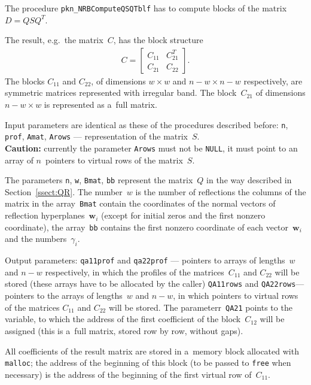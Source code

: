 The procedure \texttt{pkn\_NRBComputeQSQTblf} has to compute blocks of the matrix
$D=QSQ^T$.

The result, e.g.\ the matrix~$C$, has the block structure
\begin{align*}
  C = \left[\begin{array}{cc}
     C_{11} & C_{21}^T \\ C_{21} & C_{22}
  \end{array}\right].
\end{align*}
The blocks $C_{11}$ and $C_{22}$, of dimensions $w\times w$ and
$n-w\times n-w$ respectively, are symmetric matrices represented
with irregular band. The block~$C_{21}$ of dimensions
$n-w\times w$ is represented as a~full matrix.

Input parameters are identical as these of the procedures
described before: \texttt{n}, \texttt{prof}, \texttt{Amat},
\texttt{Arows} --- representation of the matrix~$S$. \\
\textbf{Caution:} currently the parameter \texttt{Arows} must not be
\texttt{NULL}, it must point to an array of $n$~pointers to virtual
rows of the matrix~$S$.

The parameters \texttt{n}, \texttt{w}, \texttt{Bmat}, \texttt{bb} represent
the matrix~$Q$ in the way described in Section~\ref{ssect:QR}.
The number~$w$ is the number of reflections the columns of the matrix
in the array~\texttt{Bmat} contain the coordinates of the normal vectors
of reflection hyperplanes~$\bm{w}_i$
(except for initial zeros and the first nonzero coordinate),
the array~\texttt{bb} contains the first nonzero coordinate of each
vector~$\bm{w}_i$ and the numbers~$\gamma_i$.

Output parameters: \texttt{qa11prof} and \texttt{qa22prof} --- pointers to
arrays of lengths~$w$ and $n-w$ respectively, in which the profiles of
the matrices~$C_{11}$ and $C_{22}$ will be stored
(these arrays have to be allocated by the caller)
\texttt{QA11rows} and \texttt{QA22rows}--- pointers to the arrays
of lengths~$w$ and $n-w$, in which pointers to virtual rows of the matrices
$C_{11}$ and $C_{22}$ will be stored.
The parameterr~\texttt{QA21} points to the variable, to which the address of
the first coefficient of the block~$C_{12}$ will be assigned (this is
a~full matrix, stored row by row, without gaps).

All coefficients of the result matrix are stored in a~memory block
allocated with \texttt{malloc}; the address of the beginning of this block
(to be passed to \texttt{free} when necessary)
is the address of the beginning of the first virtual row of~$C_{11}$.

